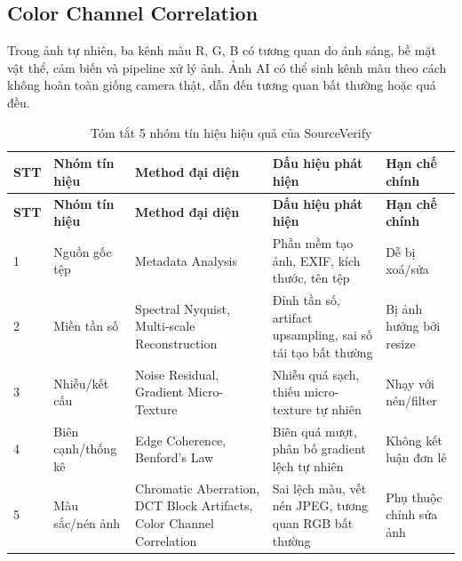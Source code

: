 \subsection{Color Channel Correlation}
Trong ảnh tự nhiên, ba kênh màu R, G, B có tương quan do ánh sáng, bề mặt vật thể, cảm biến và pipeline xử lý ảnh. Ảnh AI có thể sinh kênh màu theo cách không hoàn toàn giống camera thật, dẫn đến tương quan bất thường hoặc quá đều.

\begin{longtable}{p{}p{}p{}p{}p{}}
\caption{Tóm tắt 5 nhóm tín hiệu hiệu quả của SourceVerify}\label{tab:signal-groups}\\
\toprule
\textbf{STT} & \textbf{Nhóm tín hiệu} & \textbf{Method đại diện} & \textbf{Dấu hiệu phát hiện} & \textbf{Hạn chế chính} \\
\midrule
\endfirsthead
\toprule
\textbf{STT} & \textbf{Nhóm tín hiệu} & \textbf{Method đại diện} & \textbf{Dấu hiệu phát hiện} & \textbf{Hạn chế chính} \\
\midrule
\endhead
1 & Nguồn gốc tệp & Metadata Analysis & Phần mềm tạo ảnh, EXIF, kích thước, tên tệp & Dễ bị xoá/sửa \\
2 & Miền tần số & Spectral Nyquist, Multi-scale Reconstruction & Đỉnh tần số, artifact upsampling, sai số tái tạo bất thường & Bị ảnh hưởng bởi resize \\
3 & Nhiễu/kết cấu & Noise Residual, Gradient Micro-Texture & Nhiễu quá sạch, thiếu micro-texture tự nhiên & Nhạy với nén/filter \\
4 & Biên cạnh/thống kê & Edge Coherence, Benford's Law & Biên quá mượt, phân bố gradient lệch tự nhiên & Không kết luận đơn lẻ \\
5 & Màu sắc/nén ảnh & Chromatic Aberration, DCT Block Artifacts, Color Channel Correlation & Sai lệch màu, vết nén JPEG, tương quan RGB bất thường & Phụ thuộc chỉnh sửa ảnh \\
\bottomrule
\end{longtable}
